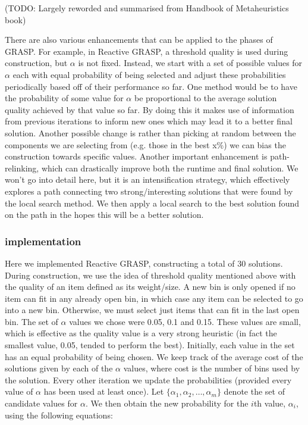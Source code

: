 \documentclass[12pt]{article}
\begin{document}
(TODO: Largely reworded and summarised from Handbook of Metaheuristics book) 

There are also various enhancements that can be applied to the phases of GRASP. For example, in Reactive GRASP, a threshold quality is used during construction, but $\alpha$ is not fixed. Instead, we start with a set of possible values for $\alpha$ each with equal probability of being selected and adjust these probabilities periodically based off of their performance so far. One method would be to have the probability of some value for $\alpha$ be proportional to the average solution quality achieved by that value so far. By doing this it makes use of information from previous iterations to inform new ones which may lead it to a better final solution. Another possible change is rather than picking at random between the components we are selecting from (e.g. those in the best x\%) we can bias the construction towards specific values. Another important enhancement is path-relinking, which can drastically improve both the runtime and final solution. We won’t go into detail here, but it is an intensification strategy, which effectively explores a path connecting two strong/interesting solutions that were found by the local search method. We then apply a local search to the best solution found on the path in the hopes this will be a better solution. 

\subsubsection{implementation}

Here we implemented Reactive GRASP, constructing a total of 30 solutions. During construction, we use the idea of threshold quality mentioned above with the quality of an item defined as its weight/size. A new bin is only opened if no item can fit in any already open bin, in which case any item can be selected to go into a new bin. Otherwise, we must select just items that can fit in the last open bin. The set of $\alpha$ values we chose were 0.05, 0.1 and 0.15. These values are small, which is effective as the quality value is a very strong heuristic (in fact the smallest value, 0.05, tended to perform the best). Initially, each value in the set has an equal probability of being chosen. We keep track of the average cost of the solutions given by each of the $\alpha$ values, where cost is the number of bins used by the solution. Every other iteration we update the probabilities (provided every value of $\alpha$ has been used at least once). Let $\{\alpha_1, \alpha_2, \ldots, \alpha_m\}$ denote the set of candidate values for $\alpha$. We then obtain the new probability for the $i$th value, $\alpha_i$, using the following equations:  
\end{document}
